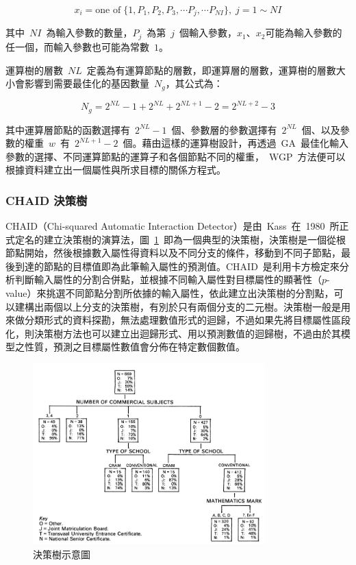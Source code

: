 \begin{equation} x_i = \text{one of}\; \{1, P_1, P_2, P_3, \cdots P_j, \cdots P_{NI}\},\; j = 1 \sim NI \label{eq:WGP-xi}\end{equation}

其中~$NI$~為輸入參數的數量，$P_j$~為第~$j$~個輸入參數，$x_1$、$x_2$可能為輸入參數的任一個，而輸入參數也可能為常數~$1$。

運算樹的層數~$NL$~定義為有運算節點的層數，即運算層的層數，運算樹的層數大小會影響到需要最佳化的基因數量~$N_g$，其公式為：

\begin{equation} N_g = 2^{NL} - 1 + 2^{NL} + 2^{NL + 1} - 2 = 2^{NL + 2} - 3  \label{eq:WGP-N}\end{equation}


其中運算層節點的函數選擇有~$2^{NL} - 1$~個、參數層的參數選擇有~$2^{NL}$~個、以及參數的權重~$w$~有~$2^{NL + 1} - 2$~個。藉由這樣的運算樹設計，再透過~GA~最佳化輸入參數的選擇、不同運算節點的運算子和各個節點不同的權重，~WGP~方法便可以根據資料建立出一個屬性與所求目標的關係方程式。


\subsubsection{CHAID 決策樹}

CHAID（Chi-squared Automatic Interaction Detector）是由~Kass\cite{kass1980exploratory}~在~1980~所正式定名的建立決策樹的演算法，圖~\ref{fig:Decision-Tree-sample}\cite{kass1980exploratory}~即為一個典型的決策樹，決策樹是一個從根節點開始，然後根據數入屬性得資料以及不同分支的條件，移動到不同子節點，最後到達的節點的目標值即為此筆輸入屬性的預測值。CHAID~是利用卡方檢定來分析判斷輸入屬性的分割合併點，並根據不同輸入屬性對目標屬性的顯著性（$p$-value）來挑選不同節點分割所依據的輸入屬性，依此建立出決策樹的分割點，可以建構出兩個以上分支的決策樹，有別於只有兩個分支的二元樹。決策樹一般是用來做分類形式的資料探勘，無法處理數值形式的迴歸，不過如果先將目標屬性區段化，則決策樹方法也可以建立出迴歸形式、用以預測數值的迴歸樹，不過由於其模型之性質，預測之目標屬性數值會分佈在特定數個數值。

\begin{figure}[hbtp]
  \begin{center}
    \includegraphics[width=0.8\textwidth]{figures/decision-tree.pdf}
    \caption{決策樹示意圖} 
    \label{fig:Decision-Tree-sample}
  \end{center}
\end{figure}


